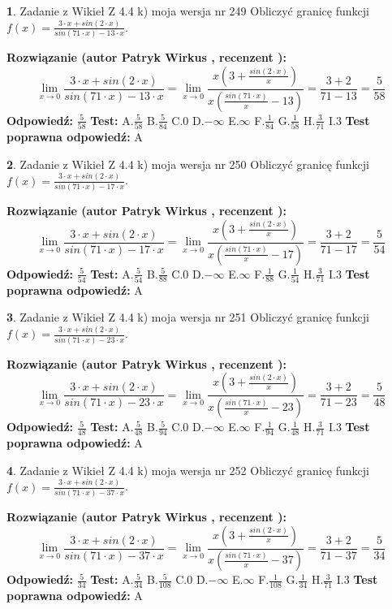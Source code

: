 \documentclass[12pt, a4paper]{article}
\theoremstyle{definition} %
\newtheorem{zad}{}
\newcommand{\zadStart}[1]{\begin{zad}#1\newline}
\newcommand{\zadStop}{\end{zad}}
\newcommand{\rozwStart}[2]{\noindent \textbf{Rozwiązanie (autor #1 , recenzent #2): }\newline}
\newcommand{\rozwStop}{\newline}
\newcommand{\odpStart}{\noindent \textbf{Odpowiedź:}\newline}
\newcommand{\odpStop}{\newline}
\newcommand{\testStart}{\noindent \textbf{Test:}\newline}
\newcommand{\testStop}{\newline}
\newcommand{\kluczStart}{\noindent \textbf{Test poprawna odpowiedź:}\newline}
\newcommand{\kluczStop}{\newline}
\begin{document}
\zadStart{Zadanie z Wikieł Z 4.4 k) moja wersja nr 249}
Obliczyć granicę funkcji $f(x)=\frac{3\cdot x +sin(2\cdot x)}{sin(71\cdot x) -13\cdot x}$.
\zadStop
\rozwStart{Patryk Wirkus}{}
$$\lim\limits_{x\to 0}\frac{3\cdot x +sin(2\cdot x)}{sin(71\cdot x) -13\cdot x}
=\lim\limits_{x\to 0}\frac{x(3+\frac{sin(2\cdot x)}{x})}{x(\frac{sin(71\cdot x)}{x}-13)}
=\frac{3+2}{71-13} = \frac{5}{58}$$
\rozwStop
\odpStart
$\frac{5}{58}$
\odpStop
\testStart
A.$\frac{5}{58}$
B.$\frac{5}{84}$
C.$0$
D.$-\infty$
E.$\infty$
F.$\frac{1}{84}$
G.$\frac{1}{58}$
H.$\frac{3}{71}$
I.$3$
\testStop
\kluczStart
A
\kluczStop



\zadStart{Zadanie z Wikieł Z 4.4 k) moja wersja nr 250}
Obliczyć granicę funkcji $f(x)=\frac{3\cdot x +sin(2\cdot x)}{sin(71\cdot x) -17\cdot x}$.
\zadStop
\rozwStart{Patryk Wirkus}{}
$$\lim\limits_{x\to 0}\frac{3\cdot x +sin(2\cdot x)}{sin(71\cdot x) -17\cdot x}
=\lim\limits_{x\to 0}\frac{x(3+\frac{sin(2\cdot x)}{x})}{x(\frac{sin(71\cdot x)}{x}-17)}
=\frac{3+2}{71-17} = \frac{5}{54}$$
\rozwStop
\odpStart
$\frac{5}{54}$
\odpStop
\testStart
A.$\frac{5}{54}$
B.$\frac{5}{88}$
C.$0$
D.$-\infty$
E.$\infty$
F.$\frac{1}{88}$
G.$\frac{1}{54}$
H.$\frac{3}{71}$
I.$3$
\testStop
\kluczStart
A
\kluczStop



\zadStart{Zadanie z Wikieł Z 4.4 k) moja wersja nr 251}
Obliczyć granicę funkcji $f(x)=\frac{3\cdot x +sin(2\cdot x)}{sin(71\cdot x) -23\cdot x}$.
\zadStop
\rozwStart{Patryk Wirkus}{}
$$\lim\limits_{x\to 0}\frac{3\cdot x +sin(2\cdot x)}{sin(71\cdot x) -23\cdot x}
=\lim\limits_{x\to 0}\frac{x(3+\frac{sin(2\cdot x)}{x})}{x(\frac{sin(71\cdot x)}{x}-23)}
=\frac{3+2}{71-23} = \frac{5}{48}$$
\rozwStop
\odpStart
$\frac{5}{48}$
\odpStop
\testStart
A.$\frac{5}{48}$
B.$\frac{5}{94}$
C.$0$
D.$-\infty$
E.$\infty$
F.$\frac{1}{94}$
G.$\frac{1}{48}$
H.$\frac{3}{71}$
I.$3$
\testStop
\kluczStart
A
\kluczStop



\zadStart{Zadanie z Wikieł Z 4.4 k) moja wersja nr 252}
Obliczyć granicę funkcji $f(x)=\frac{3\cdot x +sin(2\cdot x)}{sin(71\cdot x) -37\cdot x}$.
\zadStop
\rozwStart{Patryk Wirkus}{}
$$\lim\limits_{x\to 0}\frac{3\cdot x +sin(2\cdot x)}{sin(71\cdot x) -37\cdot x}
=\lim\limits_{x\to 0}\frac{x(3+\frac{sin(2\cdot x)}{x})}{x(\frac{sin(71\cdot x)}{x}-37)}
=\frac{3+2}{71-37} = \frac{5}{34}$$
\rozwStop
\odpStart
$\frac{5}{34}$
\odpStop
\testStart
A.$\frac{5}{34}$
B.$\frac{5}{108}$
C.$0$
D.$-\infty$
E.$\infty$
F.$\frac{1}{108}$
G.$\frac{1}{34}$
H.$\frac{3}{71}$
I.$3$
\testStop
\kluczStart
A
\kluczStop
\end{document}
